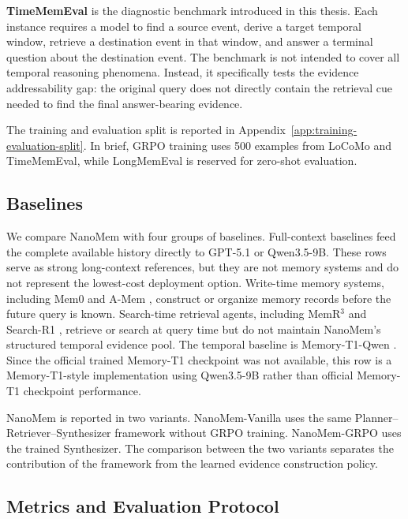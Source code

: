 \textbf{TimeMemEval} is the diagnostic benchmark introduced in this thesis. Each
instance requires a model to find a source event, derive a target temporal
window, retrieve a destination event in that window, and answer a terminal
question about the destination event. The benchmark is not intended to cover all
temporal reasoning phenomena. Instead, it specifically tests the evidence
addressability gap: the original query does not directly contain the retrieval
cue needed to find the final answer-bearing evidence.

The training and evaluation split is reported in
Appendix~\ref{app:training-evaluation-split}. In brief, GRPO training uses 500
examples from LoCoMo and TimeMemEval, while LongMemEval is reserved for
zero-shot evaluation.

\subsection{Baselines}
\label{subsec:experiment-baselines}

We compare NanoMem with four groups of baselines. Full-context baselines feed
the complete available history directly to GPT-5.1 or Qwen3.5-9B. These rows
serve as strong long-context references, but they are not memory systems and do
not represent the lowest-cost deployment option. Write-time memory systems,
including Mem0 \cite{chhikara2025mem0} and A-Mem \cite{xu2025amem}, construct
or organize memory records before the future query is known. Search-time
retrieval agents, including MemR$^3$ \cite{du2025memr3} and Search-R1
\cite{jin2025searchr1}, retrieve or search at query time but do not maintain
NanoMem's structured temporal evidence pool. The temporal baseline is
Memory-T1-Qwen \cite{du2026memoryt1}. Since the official trained Memory-T1
checkpoint was not available, this row is a Memory-T1-style implementation
using Qwen3.5-9B rather than official Memory-T1 checkpoint performance.

NanoMem is reported in two variants. NanoMem-Vanilla uses the same
Planner--Retriever--Synthesizer framework without GRPO training. NanoMem-GRPO
uses the trained Synthesizer. The comparison between the two variants separates
the contribution of the framework from the learned evidence construction
policy.

\subsection{Metrics and Evaluation Protocol}
\label{subsec:experiment-metrics}

